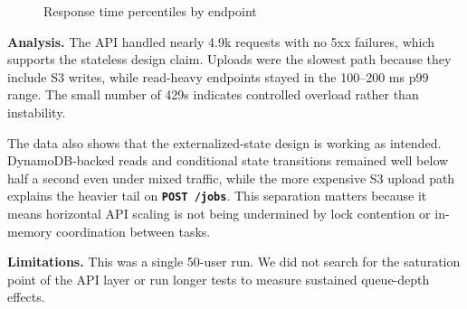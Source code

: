 \documentclass[10pt,letterpaper]{article}
\newcommand{\http}[1]{\textbf{\texttt{#1}}}
\begin{document}
\begin{figure}[H]
\centering
{}
\caption{Response time percentiles by endpoint}
\end{figure}

\begin{resultbox}
\textbf{Analysis.} The API handled nearly 4.9k requests with no 5xx failures, which supports the stateless design claim. Uploads were the slowest path because they include S3 writes, while read-heavy endpoints stayed in the 100--200 ms p99 range. The small number of 429s indicates controlled overload rather than instability.

The data also shows that the externalized-state design is working as intended. DynamoDB-backed reads and conditional state transitions remained well below half a second even under mixed traffic, while the more expensive S3 upload path explains the heavier tail on \http{POST /jobs}. This separation matters because it means horizontal API scaling is not being undermined by lock contention or in-memory coordination between tasks.
\end{resultbox}

\begin{limitbox}
\textbf{Limitations.} This was a single 50-user run. We did not search for the saturation point of the API layer or run longer tests to measure sustained queue-depth effects.
\end{limitbox}
\end{document}
